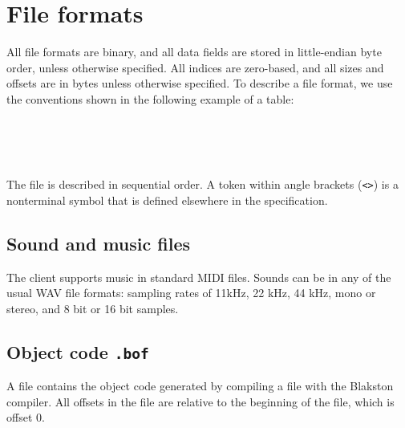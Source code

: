 \chapter{File formats}
\label{app:formats}

All file formats are binary, and all data fields are stored in
little-endian byte order, unless otherwise specified.  All indices are
zero-based, and all sizes and offsets are in bytes unless otherwise
specified.  To describe a file format, we use the conventions shown in
the following example of a table:

\begin{protocol}
\\
\\
\\
\end{protocol}

The file is described in sequential order.  A token within angle
brackets ({\tt <>}) is a nonterminal symbol that is defined elsewhere
in the specification.

\section{Sound and music files}

The client supports music in standard MIDI files.  Sounds can be in
any of the usual WAV file formats:  sampling rates of 11kHz, 22 kHz,
44 kHz, mono or stereo, and 8 bit or 16 bit samples.

\section{Object code {\tt .bof}}

A \bof file contains the object code generated by compiling a \kod
file with the Blakston compiler.  All offsets in the file are relative
to the beginning of the file, which is offset 0.

